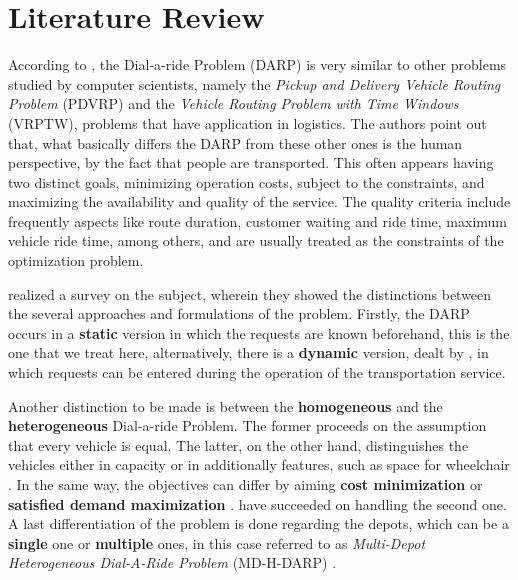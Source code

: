 \documentclass[tuberlin,cic,tc,openright,english,noabntcite,oneside]{iiufrgs}
\begin{document}
\chapter{Literature Review}
According to \textcite[p. 30]{cordeau_dial--ride_2007}, the Dial-a-ride Problem (DARP) is very similar to other problems studied by computer scientists, namely the \emph{Pickup and Delivery Vehicle Routing Problem} (PDVRP) and the \emph{Vehicle Routing Problem with Time Windows} (VRPTW), problems that have application in logistics. The authors point out that, what basically differs the DARP from these other ones is the human perspective, by the fact that people are transported. This often appears having two distinct goals, minimizing operation costs, subject to the constraints, and maximizing the availability and quality of the service. The quality criteria include frequently aspects like route duration, customer waiting and ride time, maximum vehicle ride time, among others, and are usually treated as the constraints of the optimization problem.

\textcite{cordeau_dial--ride_2007} realized a survey on the subject, wherein they showed the distinctions between the several approaches and formulations of the problem. Firstly, the DARP occurs in a \textbf{static} version in which the requests are known beforehand, this is the one that we treat here, alternatively, there is a \textbf{dynamic} version, dealt by \textcite{berbeglia_dynamic_2010}, in which requests can be entered during the operation of the transportation service.

Another distinction to be made is between the \textbf{homogeneous} and the \textbf{heterogeneous} Dial-a-ride Problem. The former proceeds on the assumption that every vehicle is equal. The latter, on the other hand, distinguishes the vehicles either in capacity or in additionally features, such as space for wheelchair  \parencite[p. 593]{parragh_models_2012}. In the same way, the objectives can differ by aiming \textbf{cost minimization} or \textbf{satisfied demand maximization} \parencite[p. 30]{cordeau_dial--ride_2007}. \textcite{urra_hyperheuristic_2015} have succeeded on handling the second one. A last differentiation of the problem is done regarding the depots, which can be a \textbf{single} one or \textbf{multiple} ones, in this case referred to as \emph{Multi-Depot Heterogeneous Dial-A-Ride Problem} (MD-H-DARP) \parencite[p. 166]{braekers_exact_2014}.
\end{document}

